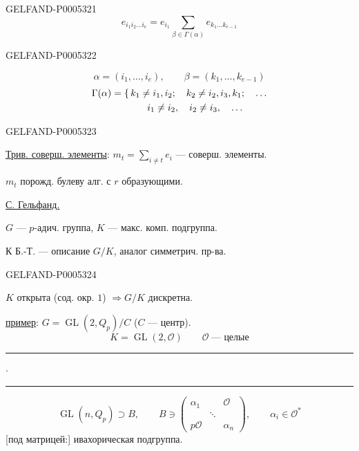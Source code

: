 \begin{GelfandAdjacentEvidence}{GELFAND-P000532}{1}
\[
e_{i_1i_2\ldots i_e}=e_{i_1}\sum_{\beta\in\Gamma(\alpha)}e_{k_1\ldots k_{e-1}}
\]
\end{GelfandAdjacentEvidence}
\begin{GelfandAdjacentEvidence}{GELFAND-P000532}{2}

\[
\alpha=(i_1,\ldots,i_e),\qquad \beta=(k_1,\ldots,k_{e-1})
\]
\[
\begin{aligned}
\Gamma(\alpha)&=\{\,k_1\ne i_1,i_2;\quad k_2\ne i_2,i_3,k_1;\quad\ldots\\
&\hphantom{=\{\,}\qquad i_1\ne i_2,\quad i_2\ne i_3,\quad\ldots
\end{aligned}
\]
\end{GelfandAdjacentEvidence}
\begin{GelfandAdjacentEvidence}{GELFAND-P000532}{3}


\noindent\makebox[.77\linewidth]{\dotfill}\par

\uline{Трив. соверш. элементы}: \(m_t=\sum_{i\ne t}e_i\) — соверш. элементы.

$m_t$ порожд. булеву алг. с $r$ образующими.

\uline{С. Гельфанд.}


$G$ — $p$-адич. группа, $K$ — макс. комп. подгруппа.

К Б.-Т. — описание $G/K$, аналог симметрич. пр-ва.
\end{GelfandAdjacentEvidence}
\begin{GelfandAdjacentEvidence}{GELFAND-P000532}{4}


$K$ открыта (сод. окр. $1$) $\Rightarrow G/K$ дискретна.

\uline{пример}: $G=\operatorname{GL}(2,Q_p)/C$ ($C$ — центр).
\[
K=\operatorname{GL}(2,\mathcal O)\qquad \mathcal O\ \text{— целые}
\]

\hfill\rule{.8cm}{.35pt}\enspace\(\cdot\)\enspace\rule{1.1cm}{.35pt}\par

\[
\operatorname{GL}(n,Q_p)\supset B,\qquad
B\ni
\begin{pmatrix}
\alpha_1&&\mathcal O\\
&\ddots&\\
p\mathcal O&&\alpha_n
\end{pmatrix},
\qquad \alpha_i\in\mathcal O^*
\]
[под матрицей:] ивахорическая подгруппа.
\end{GelfandAdjacentEvidence}
